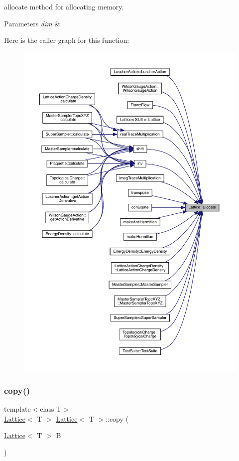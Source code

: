 allocate method for allocating memory. 


\begin{DoxyParams}{Parameters}
{\em dim} & \\
\hline
\end{DoxyParams}
Here is the caller graph for this function\+:\nopagebreak
\begin{figure}[H]
\begin{center}
\leavevmode
\includegraphics[width=350pt]{class_lattice_a5b4e162f06f7b4b90b4a9335ed2aabb5_icgraph}
\end{center}
\end{figure}
\mbox{\label{class_lattice_a85154fbd1b0ae42af329135c6cd11f34}} 
\subsubsection{\texorpdfstring{copy()}{copy()}}
{\footnotesize\ttfamily template$<$class T$>$ \\
\mbox{\hyperlink{class_lattice}{Lattice}}$<$ T $>$ \mbox{\hyperlink{class_lattice}{Lattice}}$<$ T $>$\+::copy (\begin{DoxyParamCaption}\item[{\mbox{\hyperlink{class_lattice}{Lattice}}$<$ T $>$}]{B }\end{DoxyParamCaption})\hspace{0.3cm}{\ttfamily [inline]}}



